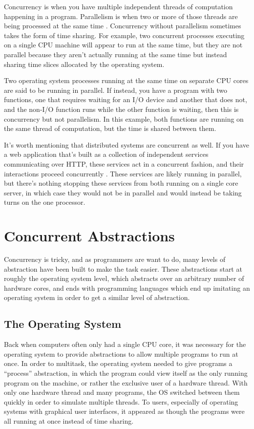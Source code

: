 \documentclass{article}
\begin{document}
Concurrency is when you have multiple independent threads of computation
happening in a program. Parallelism is when two or more of those threads are
being processed at the same time \cite{PCTheoryAndPractice}. Concurrency without
parallelism sometimes takes the form of time sharing. For example, two
concurrent processes executing on a single CPU machine will appear to run at the
same time, but they are not parallel because they aren't actually running at the
same time but instead sharing time slices allocated by the operating system.

Two operating system processes running at the same time on separate CPU cores
are said to be running in parallel. If instead, you have a program with two
functions, one that requires waiting for an I/O device and another that does
not, and the non-I/O function runs while the other function is waiting, then
this is concurrency but not parallelism. In this example, both functions are
running on the same thread of computation, but the time is shared between them.

It's worth mentioning that distributed systems are concurrent as well. If you
have a web application that's built as a collection of independent services
communicating over HTTP, these services act in a concurrent fashion, and their
interactions proceed concurrently \cite{TuftsCS21, MIT6031}. These services are
likely running in parallel, but there's nothing stopping these services from
both running on a single core server, in which case they would not be in
parallel and would instead be taking turns on the one processor.

\section{Concurrent Abstractions}
Concurrency is tricky, and as programmers are want to do, many levels of abstraction
have been built to make the task easier. These abstractions start at roughly the operating
system level, which abstracts over an arbitrary number of hardware cores, and ends with
programming languages which end up imitating an operating system in order to get a similar
level of abstraction.

\subsection{The Operating System}
Back when computers often only had a single CPU core, it was necessary for the
operating system to provide abstractions to allow multiple programs to run at
once. In order to multitask, the operating system needed to give programs a
``process'' abstraction, in which the program could view itself as the only
running program on the machine, or rather the exclusive user of a hardware
thread. With only one hardware thread and many programs, the OS switched between
them quickly in order to simulate multiple threads. To users, especially of
operating systems with graphical user interfaces, it appeared as though the
programs were all running at once instead of time sharing.
\end{document}
